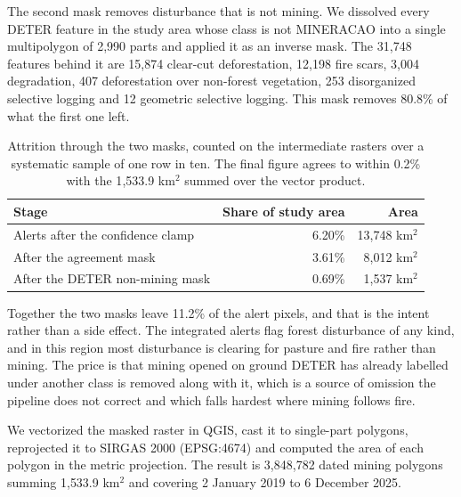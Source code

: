 \documentclass[11pt]{article}
\begin{document}

The second mask removes disturbance that is not mining. We dissolved every DETER feature in the study area whose class is not MINERACAO into a single multipolygon of 2{,}990 parts and applied it as an inverse mask. The 31{,}748 features behind it are 15{,}874 clear-cut deforestation, 12{,}198 fire scars, 3{,}004 degradation, 407 deforestation over non-forest vegetation, 253 disorganized selective logging and 12 geometric selective logging. This mask removes 80.8\% of what the first one left.

\begin{table}[htbp]
\centering
\begin{tabular}{lrr}
\hline
Stage & Share of study area & Area \\
\hline
Alerts after the confidence clamp & 6.20\% & 13{,}748 km$^2$ \\
After the agreement mask & 3.61\% & 8{,}012 km$^2$ \\
After the DETER non-mining mask & 0.69\% & 1{,}537 km$^2$ \\
\hline
\end{tabular}
\caption{Attrition through the two masks, counted on the intermediate rasters over a systematic sample of one row in ten. The final figure agrees to within 0.2\% with the 1{,}533.9 km$^2$ summed over the vector product.}
\label{tab:attrition}
\end{table}

Together the two masks leave 11.2\% of the alert pixels, and that is the intent rather than a side effect. The integrated alerts flag forest disturbance of any kind, and in this region most disturbance is clearing for pasture and fire rather than mining. The price is that mining opened on ground DETER has already labelled under another class is removed along with it, which is a source of omission the pipeline does not correct and which falls hardest where mining follows fire.

We vectorized the masked raster in QGIS, cast it to single-part polygons, reprojected it to SIRGAS 2000 (EPSG:4674) and computed the area of each polygon in the metric projection. The result is 3{,}848{,}782 dated mining polygons summing 1{,}533.9 km$^2$ and covering 2 January 2019 to 6 December 2025.
\end{document}
